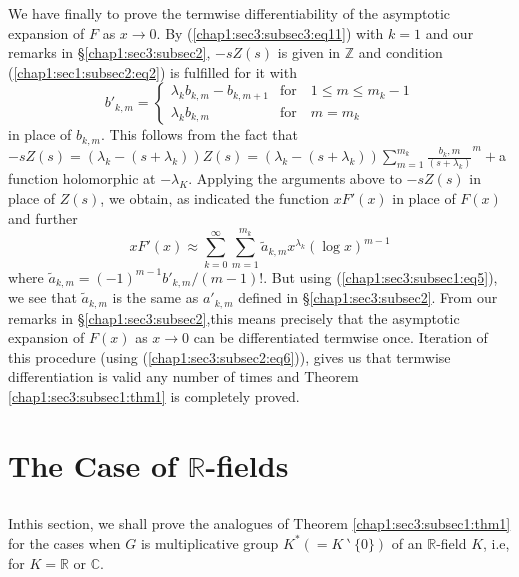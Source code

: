  We have finally to prove the termwise differentiability of the
 asymptotic expansion of $F$ as $x\rightarrow 0$. By
 (\ref{chap1:sec3:subsec3:eq11}) with $k=1$ and
 our remarks in \S \ref{chap1:sec3:subsec2}, $-sZ(s)$ is given in
 $\mathbb{Z}$ and 
 condition (\ref{chap1:sec1:subsec2:eq2}) is fulfilled for it with
\begin{equation*}
  b'_{k,m}=
  \begin{cases}
    \lambda_{k}b_{k,m} -b_{k, m+1} & \text{for} \quad 1\le m\le m_{k}-1\\
    \lambda_{k}b_{k,m} &\text{for}\quad m=m_{k}
  \end{cases}
\end{equation*}
in place of $b_{k,m}$. This follows from the fact that
$-sZ(s)=(\lambda_{k}-(s+\lambda_{k}))Z(s)=(\lambda_{k}-(s+\lambda_{k}))\sum\limits_{m=1}^{m_{k}}\frac{b_{k},m}{(s+\lambda_{k})}^{m}+$a
function holomorphic at $-\lambda_{K}$. Applying the arguments above to
$-sZ(s)$ in place of $Z(s)$, we obtain, as indicated the function
$xF'(x)$ in place of $F(x)$ and further
\begin{equation*}
  xF'(x)\approx
  \sum\limits_{k=0}^{\infty}\sum\limits_{m=1}^{m_{k}}
  \widetilde{a}_{k,m} x^{\lambda_{k}}(\log x)^{m-1}
\end{equation*}
where $\widetilde{a}_{k,m}=(-1)^{m-1}b'_{k,m}/(m-1)!$. But using
(\ref{chap1:sec3:subsec1:eq5}),
we see that $\widetilde{a}_{k,m}$ is the same as $a'_{k,m}$ defined in
\S \ref{chap1:sec3:subsec2}. From our remarks in \S \ref{chap1:sec3:subsec2},this  means
precisely that the asymptotic expansion of $F(x)$ as $x\rightarrow 0$
can be differentiated termwise once. Iteration of this procedure
(using (\ref{chap1:sec3:subsec2:eq6})), gives us that termwise
differentiation is valid any 
number of times and Theorem \ref{chap1:sec3:subsec1:thm1} is
completely proved. 

\section{The Case of $\mathbb{R}$-fields}\label{chap1:sec4} %

\subsection{}\label{chap1:sec4:subsec1} %

In\pageoriginale this section, we shall prove the analogues of
Theorem \ref{chap1:sec3:subsec1:thm1} for the
cases when $G$ is multiplicative group $K^{\ast}(=K~\backprime~ \{0\})$ of an
$\mathbb{R}$-field $K$, i.e, for $K=\mathbb{R}$ or $\mathbb{C}$.
 
